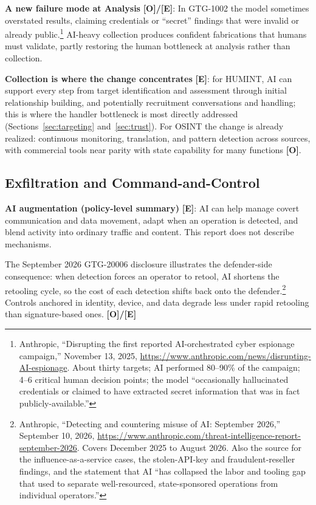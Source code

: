 \documentclass[11pt,letterpaper]{article}
\begin{document}
\textbf{A new failure mode at Analysis} \textbf{[O]/[E]}: In GTG-1002 the model sometimes overstated results, claiming credentials or ``secret'' findings that were invalid or already public.\footnote{Anthropic, ``Disrupting the first reported AI-orchestrated cyber espionage campaign,'' November 13, 2025, \url{https://www.anthropic.com/news/disrupting-AI-espionage}. About thirty targets; AI performed 80--90\% of the campaign; 4--6 critical human decision points; the model ``occasionally hallucinated credentials or claimed to have extracted secret information that was in fact publicly-available.''} AI-heavy collection produces confident fabrications that humans must validate, partly restoring the human bottleneck at analysis rather than collection.

\textbf{Collection is where the change concentrates} \textbf{[E]}: for HUMINT, AI can support every step from target identification and assessment through initial relationship building, and potentially recruitment conversations and handling; this is where the handler bottleneck is most directly addressed (Sections~\ref{sec:targeting} and~\ref{sec:trust}). For OSINT the change is already realized: continuous monitoring, translation, and pattern detection across sources, with commercial tools near parity with state capability for many functions \textbf{[O]}.

\subsection{Exfiltration and Command-and-Control}

\textbf{AI augmentation (policy-level summary)} \textbf{[E]}: AI can help manage covert communication and data movement, adapt when an operation is detected, and blend activity into ordinary traffic and content. This report does not describe mechanisms.

\begin{warnbox}
The September 2026 GTG-20006 disclosure illustrates the defender-side consequence: when detection forces an operator to retool, AI shortens the retooling cycle, so the cost of each detection shifts back onto the defender.\footnote{Anthropic, ``Detecting and countering misuse of AI: September 2026,'' September 10, 2026, \url{https://www.anthropic.com/threat-intelligence-report-september-2026}. Covers December 2025 to August 2026. Also the source for the influence-as-a-service cases, the stolen-API-key and fraudulent-reseller findings, and the statement that AI ``has collapsed the labor and tooling gap that used to separate well-resourced, state-sponsored operations from individual operators.''} Controls anchored in identity, device, and data degrade less under rapid retooling than signature-based ones. \textbf{[O]/[E]}
\end{warnbox}
\end{document}
